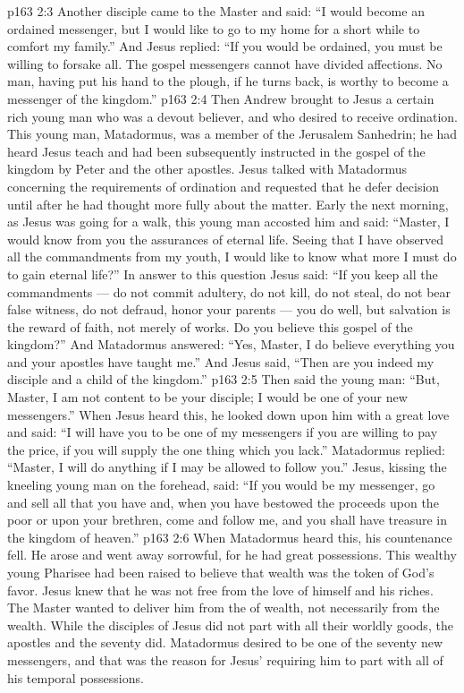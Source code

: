 \vs p163 2:3 Another disciple came to the Master and said: “I would become an ordained messenger, but I would like to go to my home for a short while to comfort my family.” And Jesus replied: \textcolor{ubdarkred}{“If you would be ordained, you must be willing to forsake all. The gospel messengers cannot have divided affections. No man, having put his hand to the plough, if he turns back, is worthy to become a messenger of the kingdom.”}
\vs p163 2:4 \pc Then Andrew brought to Jesus a certain rich young man who was a devout believer, and who desired to receive ordination. This young man, Matadormus, was a member of the Jerusalem Sanhedrin; he had heard Jesus teach and had been subsequently instructed in the gospel of the kingdom by Peter and the other apostles. Jesus talked with Matadormus concerning the requirements of ordination and requested that he defer decision until after he had thought more fully about the matter. Early the next morning, as Jesus was going for a walk, this young man accosted him and said: “Master, I would know from you the assurances of eternal life. Seeing that I have observed all the commandments from my youth, I would like to know what more I must do to gain eternal life?” In answer to this question Jesus said: \textcolor{ubdarkred}{“If you keep all the commandments --- do not commit adultery, do not kill, do not steal, do not bear false witness, do not defraud, honor your parents --- you do well, but salvation is the reward of faith, not merely of works. Do you believe this gospel of the kingdom?”} And Matadormus answered: “Yes, Master, I do believe everything you and your apostles have taught me.” And Jesus said, \textcolor{ubdarkred}{“Then are you indeed my disciple and a child of the kingdom.”}
\vs p163 2:5 Then said the young man: “But, Master, I am not content to be your disciple; I would be one of your new messengers.” When Jesus heard this, he looked down upon him with a great love and said: \textcolor{ubdarkred}{“I will have you to be one of my messengers if you are willing to pay the price, if you will supply the one thing which you lack.”} Matadormus replied: “Master, I will do anything if I may be allowed to follow you.” Jesus, kissing the kneeling young man on the forehead, said: \textcolor{ubdarkred}{“If you would be my messenger, go and sell all that you have and, when you have bestowed the proceeds upon the poor or upon your brethren, come and follow me, and you shall have treasure in the kingdom of heaven.”}
\vs p163 2:6 When Matadormus heard this, his countenance fell. He arose and went away sorrowful, for he had great possessions. This wealthy young Pharisee had been raised to believe that wealth was the token of God’s favor. Jesus knew that he was not free from the love of himself and his riches. The Master wanted to deliver him from the  of wealth, not necessarily from the wealth. While the disciples of Jesus did not part with all their worldly goods, the apostles and the seventy did. Matadormus desired to be one of the seventy new messengers, and that was the reason for Jesus’ requiring him to part with all of his temporal possessions.
